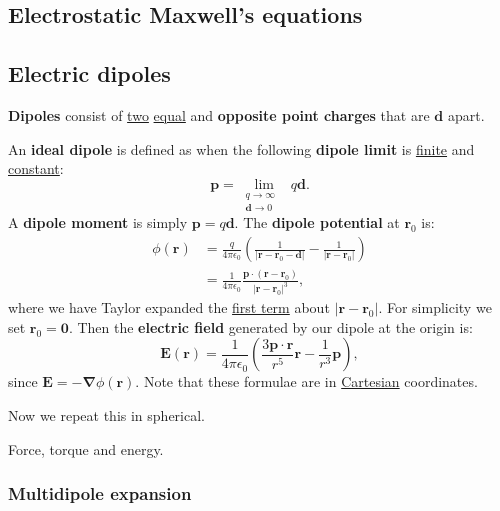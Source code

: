 \documentclass{article}
\begin{document}
\newpage

\subsection{Electrostatic Maxwell's equations}

\newpage

\subsection{Electric dipoles}
\textbf{Dipoles} consist of \underline{two} \underline{equal} and \textbf{opposite point charges} that are $\boldsymbol{d}$ apart. 

An \textbf{ideal dipole} is defined as when the following \textbf{dipole limit} is \underline{finite} and \underline{constant}:
$$\boldsymbol{p}=\lim_{\begin{smallmatrix} q\to\infty & \\ \boldsymbol{d}\to 0 \end{smallmatrix}} q\boldsymbol{d}.$$
A \textbf{dipole moment} is simply $\boldsymbol{p}=q\boldsymbol{d}$. The \textbf{dipole potential} at $\boldsymbol{r}_0$ is:
\begin{align*}
    \phi(\boldsymbol{r})
    &= \frac{q}{4\pi\epsilon_0}\left(\frac{1}{|\boldsymbol{r}-\boldsymbol{r}_0-\boldsymbol{d}|}-\frac{1}{|\boldsymbol{r}-\boldsymbol{r}_0|}\right)\\
    &=\frac{1}{4\pi\epsilon_0}\frac{\boldsymbol{p}\cdot(\boldsymbol{r}-\boldsymbol{r}_0)}{|\boldsymbol{r}-\boldsymbol{r}_0|^3},
\end{align*}
where we have Taylor expanded the \underline{first term} about $|\boldsymbol{r}-\boldsymbol{r}_0|$. For simplicity we set $\boldsymbol{r}_0=\boldsymbol{0}$. Then the \textbf{electric field} generated by our dipole at the origin is:
$$\boldsymbol{E}(\boldsymbol{r})=\frac{1}{4\pi\epsilon_0}\left(\frac{3\boldsymbol{p}\cdot\boldsymbol{r}}{r^5} \boldsymbol{r}-\frac{1}{r^3} \boldsymbol{p}\right),$$
since $\boldsymbol{E}=-\boldsymbol{\nabla}\phi(\boldsymbol{r})$. Note that these formulae are in \underline{Cartesian} coordinates.

Now we repeat this in spherical.

Force, torque and energy.

\subsubsection{Multidipole expansion}
\end{document}
